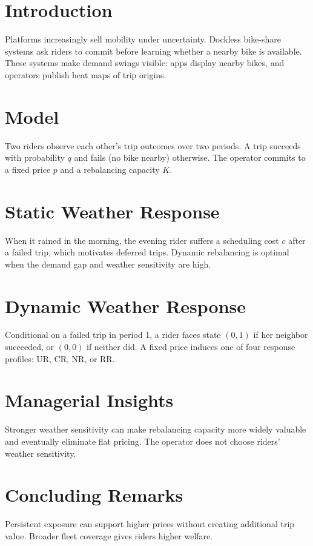 \documentclass[11pt]{article}
\begin{document}


\section{Introduction}
Platforms increasingly sell mobility under uncertainty. Dockless bike-share
systems ask riders to commit before learning whether a nearby bike is
available. These systems make demand swings visible: apps display nearby
bikes, and operators publish heat maps of trip origins.

\section{Model}
Two riders observe each other's trip outcomes over two periods. A trip
succeeds with probability $q$ and fails (no bike nearby) otherwise.
The operator commits to a fixed price $p$ and a rebalancing capacity $K$.

\section{Static Weather Response}
When it rained in the morning, the evening rider suffers a scheduling cost
$c$ after a failed trip, which motivates deferred trips. Dynamic rebalancing
is optimal when the demand gap and weather sensitivity are high.

\section{Dynamic Weather Response}
Conditional on a failed trip in period 1, a rider faces state $(0,1)$ if her
neighbor succeeded, or $(0,0)$ if neither did. A fixed price induces one of
four response profiles: UR, CR, NR, or RR.

\section{Managerial Insights}
Stronger weather sensitivity can make rebalancing capacity more widely
valuable and eventually eliminate flat pricing. The operator does not choose
riders' weather sensitivity.

\section{Concluding Remarks}
Persistent exposure can support higher prices without creating additional
trip value. Broader fleet coverage gives riders higher welfare.
\end{document}
